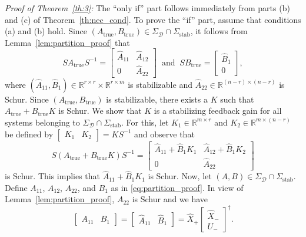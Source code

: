 \documentclass[9pt,shortpaper,twoside,web]{ieeecolor}
\begin{document}
\textit{Proof of Theorem~\ref{th:3}:} The ``only if'' part follows immediately from parts (b) and (c) of Theorem~\ref{th:nec_cond}. To prove the ``if'' part, assume that conditions (a) and (b) hold. Since $(A_\text{true},B_\text{true})\in\Sigma_\mathcal{D}\cap\Sigma_\text{stab}$, it follows from Lemma~\ref{lem:partition_proof} that
\begin{equation}
\label{eq:partition_proof_true}
SA_\text{true}S^{-1}=\begin{bmatrix}
\hat{A}_{11} & \hat{A}_{12} \\
0 & \hat{A}_{22}
\end{bmatrix}\ \text{ and }\ SB_\text{true}=\begin{bmatrix}
\hat{B}_1 \\ 0
\end{bmatrix},
\end{equation}
where $(\hat{A}_{11},\hat{B}_1)\in\mathbb{R}^{r\times r}\times \mathbb{R}^{r\times m}$ is stabilizable and \mbox{$\hat{A}_{22}\in\mathbb{R}^{(n-r)\times (n-r)}$} is Schur. Since $(A_\text{true},B_\text{true})$ is stabilizable, there exists a $K$ such that $A_\text{true}+B_\text{true}K$ is Schur. We show that $K$ is a stabilizing feedback gain for all systems belonging to $\Sigma_\mathcal{D}\cap\Sigma_\text{stab}$. For this, let $K_1\in\mathbb{R}^{m\times r}$ and $K_2\in\mathbb{R}^{m\times (n-r)}$ be defined by $\begin{bmatrix}
K_1 & K_2
\end{bmatrix}=KS^{-1}$ and observe that
\begin{equation}
S(A_\text{true}+B_\text{true}K)S^{-1}=\begin{bmatrix}
\hat{A}_{11}+\hat{B}_1K_1 & \hat{A}_{12}+\hat{B}_1K_2 \\
0 & \hat{A}_{22}
\end{bmatrix}
\end{equation}
is Schur. This implies that $\hat{A}_{11}+\hat{B}_1K_1$ is Schur. Now, let \mbox{$(A,B)\in\Sigma_\mathcal{D}\cap\Sigma_\text{stab}$}. Define $A_{11}$, $A_{12}$, $A_{22}$, and $B_1$ as in \eqref{eq:partition_proof}. In view of Lemma~\ref{lem:partition_proof}, $A_{22}$ is Schur and we have
\begin{equation}
\label{eq:id_cont_part}
\begin{bmatrix}
A_{11} & B_1
\end{bmatrix}=\begin{bmatrix}
\hat{A}_{11} & \hat{B}_1
\end{bmatrix}=\hat{X}_+\begin{bmatrix}
\hat{X}_- \\
U_-
\end{bmatrix}^\dagger. 
\end{equation}
\end{document}
